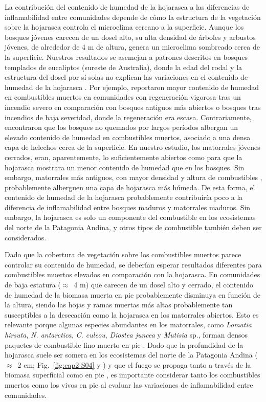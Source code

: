 La contribución del contenido de humedad de la hojarasca a las diferencias de inflamabilidad entre comunidades depende de cómo la estructura de la vegetación sobre la hojarasca controla el microclima cercano a la superficie. Aunque los bosques jóvenes carecen de un dosel alto, su alta densidad de árboles y arbustos jóvenes, de alrededor de 4 m de altura, genera un microclima sombreado cerca de la superficie. Nuestros resultados se asemejan a patrones descritos en bosques templados de eucaliptos (sureste de Australia), donde la edad del rodal y la estructura del dosel por sí solas no explican las variaciones en el contenido de humedad de la hojarasca \citep{cawson_fuel_2017, burton_shifting_2019, brown_forest_2021}. Por ejemplo, \citet{cawson_fuel_2017} reportaron mayor contenido de humedad en combustibles muertos en comunidades con regeneración vigorosa tras un incendio severo en comparación con bosques antiguos más abiertos o bosques tras incendios de baja severidad, donde la regeneración era escasa. Contrariamente, \citet{burton_shifting_2019} encontraron que los bosques no quemados por largos períodos albergan un elevado contenido de humedad en combustibles muertos, asociado a una densa capa de helechos cerca de la superficie. En nuestro estudio, los matorrales jóvenes cerrados, eran, aparentemente, lo suficientemente abiertos como para que la hojarasca mostrara un menor contenido de humedad que en los bosques. Sin embargo, matorrales más antiguos, con mayor densidad y altura de combustibles \citep{paritsis_positive_2015, tiribelli_changes_2018}, probablemente alberguen una capa de hojarasca más húmeda. De esta forma, el contenido de humedad de la hojarasca probablemente contribuiría poco a la diferencia de inflamabilidad entre bosques maduros y matorrales maduros. Sin embargo, la hojarasca es solo un componente del combustible en los ecosistemas del norte de la Patagonia Andina, y otros tipos de combustible también deben ser considerados.

Dado que la cobertura de vegetación sobre los combustibles muertos parece controlar su contenido de humedad, se deberían esperar resultados diferentes para combustibles muertos elevados en comparación con la hojarasca. En comunidades de baja estatura ($\approx$~4 m) que carecen de un dosel alto y cerrado, el contenido de humedad de la biomasa muerta en pie probablemente disminuya en función de la altura, siendo las hojas y ramas muertas más altas probablemente tan susceptibles a la desecación como la hojarasca en los matorrales abiertos. Esto es relevante porque algunas especies abundantes en los matorrales, como \textit{Lomatia hirsuta}, \textit{N. antarctica}, \textit{C. culeou}, \textit{Diostea juncea} y \textit{Mutisia} sp., forman densos paquetes de combustible fino muerto en pie \citep{blackhall_is_2012}. Dado que la profundidad de la hojarasca suele ser somera en los ecosistemas del norte de la Patagonia Andina ($\approx$~2 cm; Fig.~\ref{fig:cap2-S04} y \citealt{blackhall_effects_2017}) y que el fuego se propaga tanto a través de la biomasa superficial como en pie \citep{zylstra_biophysical_2016, ziegler_spatially_2017}, es importante considerar tanto los combustibles muertos como los vivos en pie al evaluar las variaciones de inflamabilidad entre comunidades.

